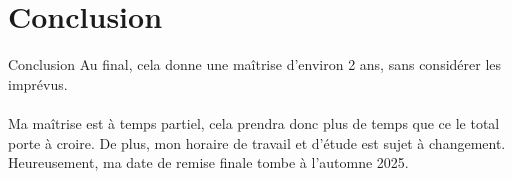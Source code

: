 \documentclass{beamer}
\begin{document}
\section{Conclusion}
\begin{frame}{Conclusion}
	Au final, cela donne une maîtrise d'environ 2 ans, sans considérer les imprévus.
	\\~\\
	Ma maîtrise est à temps partiel, cela prendra donc plus de temps que ce le total porte à croire. De plus, mon horaire de travail et d'étude est sujet à changement. Heureusement, ma date de remise finale tombe à l'automne 2025.
\end{frame}
\end{document}
